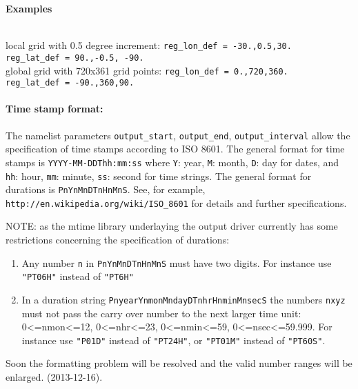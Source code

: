 \begin{tabbing}
  \parbox{0.7\textwidth}{\textbf{Examples}} \= \\
  local grid with 0.5 degree increment: \>
  \texttt{reg\_lon\_def = -30.,0.5,30.}
  \\ \>
  \texttt{reg\_lat\_def = 90.,-0.5, -90.}
  \\[0.5em]
  global grid with 720x361 grid points: \>
  \texttt{reg\_lon\_def = 0.,720,360.}
  \\ \>
  \texttt{reg\_lat\_def = -90.,360,90.}
\end{tabbing}


\paragraph{Time stamp format:}

The namelist parameters \texttt{output\_start}, \texttt{output\_end}, \texttt{output\_interval} allow
the specification of time stamps according to ISO 8601.
The general format for time stamps is \texttt{YYYY-MM-DDThh:mm:ss}
where \texttt{Y}: year, \texttt{M}: month, \texttt{D}: day for dates, 
and   \texttt{hh}: hour, \texttt{mm}: minute, \texttt{ss}: second for time strings.  
The general format for durations is \texttt{PnYnMnDTnHnMnS}.
See, for example, \texttt{http://en.wikipedia.org/wiki/ISO\_8601} for details and further specifications.

\color{red}NOTE: as the mtime library underlaying the output driver
  currently has some restrictions concerning the specification of durations:\begin{enumerate}
\item Any number \texttt{n} in \texttt{PnYnMnDTnHnMnS} must have two digits. For instance use \texttt{"PT06H"} instead of \texttt{"PT6H"}
\item In a duration string \texttt{PnyearYnmonMndayDTnhrHnminMnsecS} the numbers \texttt{nxyz} must not pass the carry over number to the next larger time unit: 0<=nmon<=12, 0<=nhr<=23, 0<=nmin<=59, 0<=nsec<=59.999. For instance use \texttt{"P01D"} instead of \texttt{"PT24H"}, or \texttt{"PT01M"} instead of \texttt{"PT60S"}.
\end{enumerate}

Soon the formatting problem will be resolved and the valid number ranges will be enlarged.
(2013-12-16).\color{black}



